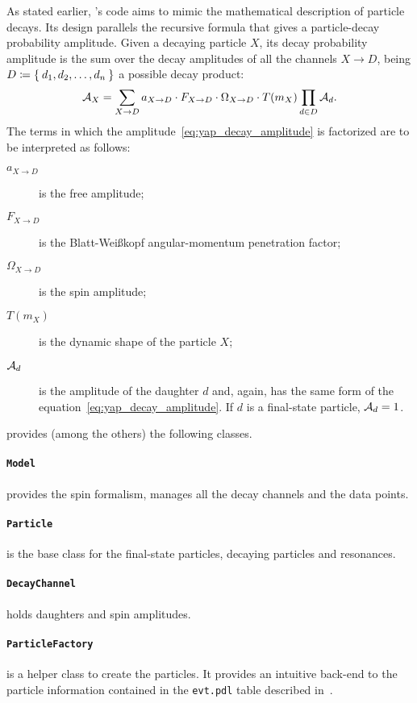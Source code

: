     As stated earlier, 's code aims to mimic the mathematical description of particle decays.
    Its design parallels the recursive formula that gives a particle-decay probability amplitude.
    Given a decaying particle $X$, its decay probability amplitude is the sum over the decay amplitudes of all the channels $X\to D$, being $D\coloneqq \Set{d_1, d_2,\dots,d_n}$ a possible decay product:
    \begin{equation}\label{eq:yap_decay_amplitude}
        \mathcal{A}_X = \sum_{X\to D} a_{X\to D}\cdot F_{X\to D}\cdot \Omega_{X\to D}\cdot T(m_X)\prod_{d\in D} \mathcal{A}_d.
    \end{equation}
    The terms in which the amplitude~\eqref{eq:yap_decay_amplitude} is factorized are to be interpreted as follows:
    \begin{description}
        \item[$a_{X\to D}$] is the free amplitude;
        \item[$F_{X\to D}$] is the Blatt-Wei\ss{}kopf angular-momentum penetration factor;
        \item[$\Omega_{X\to D}$] is the spin amplitude;
        \item[$T(m_X)$] is the dynamic shape of the particle $X$;
        \item[$\mathcal{A}_d$] is the amplitude of the daughter $d$ and, again, has the same form of the equation~\eqref{eq:yap_decay_amplitude}.
            If $d$ is a final-state particle, $\mathcal{A}_d = 1$. 
    \end{description}

     provides (among the others) the following classes.
    \paragraph{\lstinline!Model!} provides the spin formalism, manages all the decay channels and the data points.
    \paragraph{\lstinline!Particle!} is the base class for the final-state particles, decaying particles and resonances.
    \paragraph{\lstinline!DecayChannel!} holds daughters and spin amplitudes.
    \paragraph{\lstinline!ParticleFactory!} is a helper class to create the particles.
        It provides an intuitive back-end to the  particle information contained in the \texttt{evt.pdl} table described in~\cite[p.~13]{evtgen_manual}.


